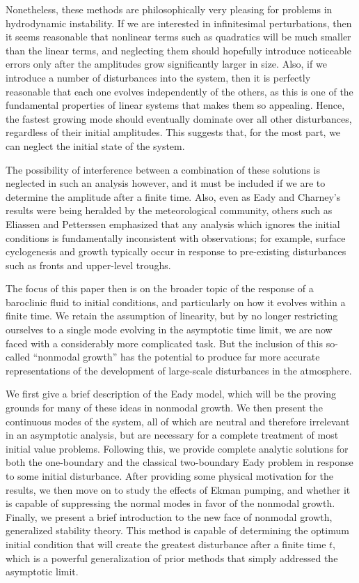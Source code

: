 \documentclass[letterpaper,11pt,onecolumn,twoside,titlepage]{article}
\begin{document}
Nonetheless, these methods are philosophically very pleasing for problems in hydrodynamic instability. If we are interested in infinitesimal perturbations, then it seems reasonable that nonlinear terms such as quadratics will be much smaller than the linear terms, and neglecting them should hopefully introduce noticeable errors only after the amplitudes grow significantly larger in size. Also, if we introduce a number of disturbances into the system, then it is perfectly reasonable that each one evolves independently of the others, as this is one of the fundamental properties of linear systems that makes them so appealing. Hence, the fastest growing mode should eventually dominate over all other disturbances, regardless of their initial amplitudes. This suggests that, for the most part, we can neglect the initial state of the system.

The possibility of interference between a combination of these solutions is neglected in such an analysis however, and it must be included if we are to determine the amplitude after a finite time. Also, even as Eady and Charney's results were being heralded by the meteorological community, others such as Eliassen and Petterssen emphasized that any analysis which ignores the initial conditions is fundamentally inconsistent with observations; for example, surface cyclogenesis and growth typically occur in response to pre-existing disturbances such as fronts and upper-level troughs. 

The focus of this paper then is on the broader topic of the response of a baroclinic fluid to initial conditions, and particularly on how it evolves within a finite time. We retain the assumption of linearity, but by no longer restricting ourselves to a single mode evolving in the asymptotic time limit, we are now faced with a considerably more complicated task. But the inclusion of this so-called ``nonmodal growth'' has the potential to produce far more accurate representations of the development of large-scale disturbances in the atmosphere.

We first give a brief description of the Eady model, which will be the proving grounds for many of these ideas in nonmodal growth. We then present the continuous modes of the system, all of which are neutral and therefore irrelevant in an asymptotic analysis, but are necessary for a complete treatment of most initial value problems. Following this, we provide complete analytic solutions for both the one-boundary and the classical two-boundary Eady problem in response to some initial disturbance. After providing some physical motivation for the results, we then move on to study the effects of Ekman pumping, and whether it is capable of suppressing the normal modes in favor of the nonmodal growth. Finally, we present a brief introduction to the new face of nonmodal growth, generalized stability theory. This method is capable of determining the optimum initial condition that will create the greatest disturbance after a finite time $t$, which is a powerful generalization of prior methods that simply addressed the asymptotic limit.
\end{document}
